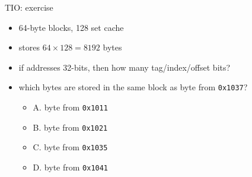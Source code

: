 \begin{frame}{TIO: exercise}
    \begin{itemize}
    \item 64-byte blocks, 128 set cache
    \item stores $64 \times 128 = 8192$ bytes
    \item if addresses 32-bits, then how many tag/index/offset bits?
    \vspace{.5cm}
    \item which bytes are stored in the same block as byte from \texttt{0x1037}?
        \begin{itemize}
        \item A. byte from \texttt{0x1011}
        \item B. byte from \texttt{0x1021}
        \item C. byte from \texttt{0x1035}
        \item D. byte from \texttt{0x1041}
        \end{itemize}
    \end{itemize}
\end{frame}
